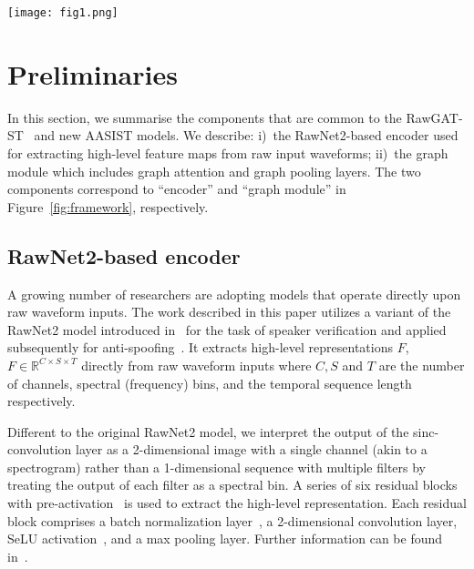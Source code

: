 \documentclass{article}
\begin{document}
\begin{figure*}[ht!]
    \centering
    \texttt{[image: fig1.png]}
    \caption{
      Overall framework of the proposed AASIST.
      {\em Identical to} \cite{tak2021end}: encoder extracts $F$ and two graph modules each model spectral and temporal domains. 
      {\em Proposed}: then, the proposed max graph operation technique adopts two branches that model heterogeneous graphs in parallel, followed by an element-wise maximum. 
      Each branch includes two proposed HS-GAL layers and two graph pooling layers (graph pooling layers and one HS-GAL layer is omitted in the illustration). 
      Finally, the maximum and average of nodes, and the stack node are concatenated followed by an output layer.
      }
    \vspace{-10pt}
    \label{fig:framework}
\end{figure*}

\section{Preliminaries}
In this section, we summarise the components that are common to the RawGAT-ST~\cite{tak2021end} and new AASIST models.
We describe: i)~the RawNet2-based encoder used for extracting high-level feature maps from raw input waveforms; ii)~the graph module which includes graph attention and graph pooling layers.
The two components correspond to ``encoder'' and ``graph module'' in Figure~\ref{fig:framework}, respectively.

\subsection{RawNet2-based encoder}
\label{sec:encoder}
A growing number of researchers are adopting models that operate directly upon raw waveform inputs. 
The work described in this paper utilizes a variant of the RawNet2 model introduced in~\cite{jung20c_interspeech} for the task of speaker verification and applied subsequently for anti-spoofing~\cite{tak2021rawnet,tak2021end}.
It extracts high-level representations $F$, $F\in\mathbb{R}^{C \times S \times T}$ directly from raw waveform inputs where $C, S$ and $T$ are the number of channels, spectral (frequency) bins, and the temporal sequence length respectively. 

Different to the original RawNet2 model, we interpret the output of the sinc-convolution layer as a 2-dimensional image with a single channel (akin to a spectrogram) rather than a 1-dimensional sequence with multiple filters by treating the output of each filter as a spectral bin.
A series of six residual blocks with pre-activation~\cite{he2016identity} is used to extract the high-level representation.
Each residual block comprises a batch normalization layer~\cite{ioffe2015batch}, a 2-dimensional convolution layer, SeLU activation~\cite{klambauer2017self}, and a max pooling layer. 
Further information can be found in~\cite{tak2021end}.
\end{document}
